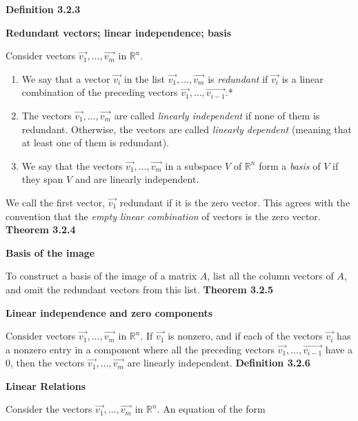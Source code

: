 \textbf{Definition 3.2.3}\\
\par\noindent\textbf{Redundant vectors; linear independence; basis}
\par\noindent Consider vectors $\vec{v_{1}},\ldots{},\vec{v_{m}}$ in $\mathbb{R}^{n}$.
\renewcommand{\labelenumi}{\textbf{\alph{enumi}.}}
\begin{enumerate}
\item We say that a vector $\vec{v_{i}}$ in the list $\vec{v_{1}},\ldots{},\vec{v_{m}}$ is \textit{redundant} if $\vec{v_{i}}$ is a linear combination of the preceding vectors $\vec{v_{1}},\ldots{},\vec{v_{i-1}}$.*
\item The vectors $\vec{v_{1}},\ldots{},\vec{v_{m}}$ are called \textit{linearly independent} if none of them is redundant. Otherwise, the vectors are called \textit{linearly dependent} (meaning that at least one of them is redundant).
\item We say that the vectors $\vec{v_{1}},\ldots{},\vec{v_{m}}$ in a subspace $V$ of $\mathbb{R}^{n}$ form a \textit{basis} of $V$ if they span $V$ and are linearly independent.
\end{enumerate}
\par\noindent *We call the first vector, $\vec{v_{1}}$ redundant if it is the zero vector. This agrees with the convention that the \textit{empty linear combination} of vectors is the zero vector.
\textbf{Theorem 3.2.4}\\
\par\noindent\textbf{Basis of the image}
\par\noindent To construct a basis of the image of a matrix $A$, list all the column vectors of $A$, and omit the redundant vectors from this list.
\textbf{Theorem 3.2.5}\\
\par\noindent\textbf{Linear independence and zero components}
\par\noindent Consider vectors $\vec{v_{1}},\ldots{},\vec{v_{m}}$ in $\mathbb{R}^{n}$. If $\vec{v_{1}}$ is nonzero, and if each of the vectors $\vec{v_{i}}$ has a nonzero entry in a component where all the preceding vectors $\vec{v_{1}},\ldots{},\vec{v_{i-1}}$ have a $0$, then the vectors $\vec{v_{1}},\ldots{},\vec{v_{m}}$ are linearly independent.
\textbf{Definition 3.2.6}\\
\par\noindent\textbf{Linear Relations}
\par\noindent Consider the vectors $\vec{v_{1}},\ldots{},\vec{v_{m}}$ in $\mathbb{R}^{n}$. An equation of the form
